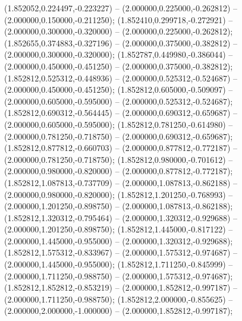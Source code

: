  (1.852052,0.224497,-0.223227) -- (2.000000,0.225000,-0.262812) -- (2.000000,0.150000,-0.211250);
 (1.852410,0.299718,-0.272921) -- (2.000000,0.300000,-0.320000) -- (2.000000,0.225000,-0.262812);
 (1.852655,0.374883,-0.327196) -- (2.000000,0.375000,-0.382812) -- (2.000000,0.300000,-0.320000);
 (1.852787,0.449980,-0.386044) -- (2.000000,0.450000,-0.451250) -- (2.000000,0.375000,-0.382812);
 (1.852812,0.525312,-0.448936) -- (2.000000,0.525312,-0.524687) -- (2.000000,0.450000,-0.451250);
 (1.852812,0.605000,-0.509097) -- (2.000000,0.605000,-0.595000) -- (2.000000,0.525312,-0.524687);
 (1.852812,0.690312,-0.564445) -- (2.000000,0.690312,-0.659687) -- (2.000000,0.605000,-0.595000);
 (1.852812,0.781250,-0.614980) -- (2.000000,0.781250,-0.718750) -- (2.000000,0.690312,-0.659687);
 (1.852812,0.877812,-0.660703) -- (2.000000,0.877812,-0.772187) -- (2.000000,0.781250,-0.718750);
 (1.852812,0.980000,-0.701612) -- (2.000000,0.980000,-0.820000) -- (2.000000,0.877812,-0.772187);
 (1.852812,1.087813,-0.737709) -- (2.000000,1.087813,-0.862188) -- (2.000000,0.980000,-0.820000);
 (1.852812,1.201250,-0.768993) -- (2.000000,1.201250,-0.898750) -- (2.000000,1.087813,-0.862188);
 (1.852812,1.320312,-0.795464) -- (2.000000,1.320312,-0.929688) -- (2.000000,1.201250,-0.898750);
 (1.852812,1.445000,-0.817122) -- (2.000000,1.445000,-0.955000) -- (2.000000,1.320312,-0.929688);
 (1.852812,1.575312,-0.833967) -- (2.000000,1.575312,-0.974687) -- (2.000000,1.445000,-0.955000);
 (1.852812,1.711250,-0.845999) -- (2.000000,1.711250,-0.988750) -- (2.000000,1.575312,-0.974687);
 (1.852812,1.852812,-0.853219) -- (2.000000,1.852812,-0.997187) -- (2.000000,1.711250,-0.988750);
 (1.852812,2.000000,-0.855625) -- (2.000000,2.000000,-1.000000) -- (2.000000,1.852812,-0.997187);
